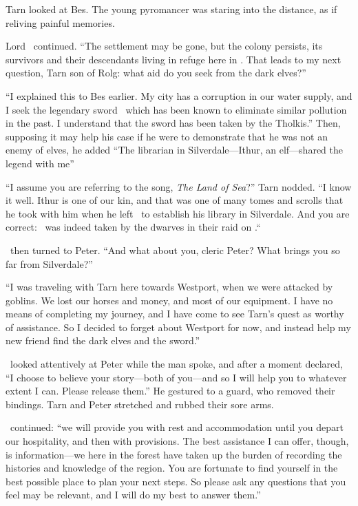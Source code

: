 Tarn looked at Bes.  The young pyromancer was staring into the distance, as if reliving painful memories.

Lord \arilor\ continued.  ``The settlement may be gone, but the colony persists, its survivors and their descendants living in refuge here in \inarthonor.  That leads to my next question, Tarn son of Rolg: what aid do you seek from the dark elves?''

``I explained this to Bes earlier.  My city has a corruption in our water supply, and I seek the legendary sword \kildir\ which has been known to eliminate similar pollution in the past.  I understand that the sword has been taken by the Tholkis.'' Then, supposing it may help his case if he were to demonstrate that he was not an enemy of elves, he added ``The librarian in Silverdale---Ithur, an elf---shared the legend with me''

``I assume you are referring to the song, \emph{The Land of Sea}?''
Tarn nodded.
``I know it well.  Ithur is one of our kin, and that was one of many tomes and scrolls that he took with him when he left \inarthonor\ to establish his library in Silverdale.  And you are correct: \kildir\ was indeed taken by the dwarves in their raid on \yedmurdim.``

\arilor\ then turned to Peter.  ``And what about you, cleric Peter?  What brings you so far from Silverdale?''

``I was traveling with Tarn here towards Westport, when we were attacked by goblins.  We lost our horses and money, and most of our equipment.  I have no means of completing my journey, and I have come to see Tarn's quest as worthy of assistance.  So I decided to forget about Westport for now, and instead help my new friend find the dark elves and the sword.''

\arilor\ looked attentively at Peter while the man spoke, and after a moment declared, ``I choose to believe your story---both of you---and so I will help you to whatever extent I can.  Please release them.'' He gestured to a guard, who removed their bindings.  Tarn and Peter stretched and rubbed their sore arms.

\arilor\ continued: ``we will provide you with rest and accommodation until you depart our hospitality, and then with provisions.  The best assistance I can offer, though, is information---we here in the forest have taken up the burden of recording the histories and knowledge of the region.  You are fortunate to find yourself in the best possible place to plan your next steps.  So please ask any questions that you feel may be relevant, and I will do my best to answer them.''

